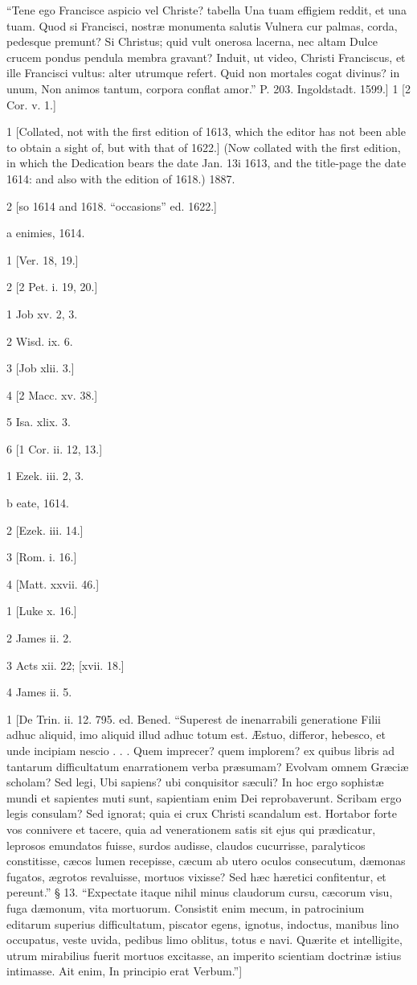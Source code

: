“Tene ego Francisce aspicio vel Christe? tabella
Una tuam effigiem reddit, et una tuam.
Quod si Francisci, nostræ monumenta salutis
Vulnera cur palmas, corda, pedesque premunt?
Si Christus; quid vult onerosa lacerna, nec altam
Dulce crucem pondus pendula membra gravant?
Induit, ut video, Christi Franciscus, et ille
Francisci vultus: alter utrumque refert.
Quid non mortales cogat divinus? in unum,
Non animos tantum, corpora conflat amor.”
P. 203. Ingoldstadt. 1599.]
1
[2 Cor. v. 1.]

1
[Collated, not with the first edition of 1613, which the editor has not been able to obtain a sight of, but with that of 1622.] (Now collated with the first edition, in which the Dedication bears the date Jan. 13i 1613, and the title-page the date 1614: and also with the edition of 1618.) 1887.

2
[so 1614 and 1618. “occasions” ed. 1622.]

a
enimies, 1614.

1
[Ver. 18, 19.]

2
[2 Pet. i. 19, 20.]

1
Job xv. 2, 3.

2
Wisd. ix. 6.

3
[Job xlii. 3.]

4
[2 Macc. xv. 38.]

5
Isa. xlix. 3.

6
[1 Cor. ii. 12, 13.]

1
Ezek. iii. 2, 3.

b
eate, 1614.

2
[Ezek. iii. 14.]

3
[Rom. i. 16.]

4
[Matt. xxvii. 46.]

1
[Luke x. 16.]

2
James ii. 2.

3
Acts xii. 22; [xvii. 18.]

4
James ii. 5.

1
[De Trin. ii. 12. 795. ed. Bened. “Superest de inenarrabili generatione Filii adhuc aliquid, imo aliquid illud adhuc totum est. Æstuo, differor, hebesco, et unde incipiam nescio . . . Quem imprecer? quem implorem? ex quibus libris ad tantarum difficultatum enarrationem verba præsumam? Evolvam omnem Græciæ scholam? Sed legi, Ubi sapiens? ubi conquisitor sæculi? In hoc ergo sophistæ mundi et sapientes muti sunt, sapientiam enim Dei reprobaverunt. Scribam ergo legis consulam? Sed ignorat; quia ei crux Christi scandalum est. Hortabor forte vos connivere et tacere, quia ad venerationem satis sit ejus qui prædicatur, leprosos emundatos fuisse, surdos audisse, claudos cucurrisse, paralyticos constitisse, cæcos lumen recepisse, cæcum ab utero oculos consecutum, dæmonas fugatos, ægrotos revaluisse, mortuos vixisse? Sed hæc hæretici confitentur, et pereunt.” § 13. “Expectate itaque nihil minus claudorum cursu, cæcorum visu, fuga dæmonum, vita mortuorum. Consistit enim mecum, in patrocinium editarum superius difficultatum, piscator egens, ignotus, indoctus, manibus lino occupatus, veste uvida, pedibus limo oblitus, totus e navi. Quærite et intelligite, utrum mirabilius fuerit mortuos excitasse, an imperito scientiam doctrinæ istius intimasse. Ait enim, In principio erat Verbum.”]

